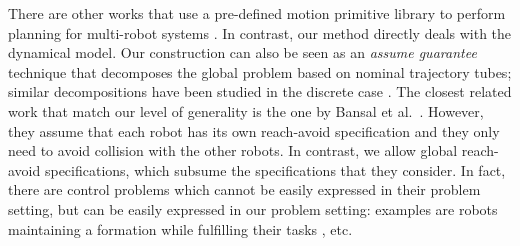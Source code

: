 \begin{enumerate}[(1)]
There are other works that use a pre-defined motion primitive library to perform planning for multi-robot 
systems \cite{saha2016implan,BanusicMPSZ19pgcd,Gavran2017antlab,desai2017drona}. 
In contrast, our method directly deals with the dynamical model. 
Our construction can also be seen as an \emph{assume guarantee} technique that decomposes the global problem based on nominal trajectory tubes; similar decompositions have been studied in the discrete case \cite{alur2015pattern,majumdarassume}.
The closest related work that match our level of generality is the one by Bansal et al.\ \cite{bansal2017safe}.
However, they assume that each robot has its own reach-avoid specification and they only need to avoid collision with the other robots.
In contrast, we allow global reach-avoid specifications, which subsume the specifications that they consider.
In fact, there are control problems which cannot be easily expressed in their problem setting, but can be easily expressed in our problem setting: 
examples are robots maintaining a formation while fulfilling their tasks \cite{alonso2019distributed}, etc.
\end{enumerate}

	




